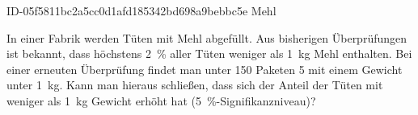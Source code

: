 \begin{exercise}
      {ID-05f5811bc2a5cc0d1afd185342bd698a9bebbc5e}
      {Mehl}
  \ifproblem\problem\par
    In einer Fabrik werden Tüten mit Mehl abgefüllt.
    Aus bisherigen Überprüfungen ist bekannt, dass
    höchstens \SI{2}{\percent} aller Tüten weniger
    als \SI{1}{\kilo\gram} Mehl enthalten.
    Bei einer erneuten Überprüfung findet man unter
    \num{150} Paketen \num{5} mit einem Gewicht
    unter \SI{1}{\kilo\gram}.
    Kann man hieraus schließen, dass sich der Anteil
    der Tüten mit weniger als \SI{1}{\kilo\gram}
    Gewicht erhöht hat
    (\SI{5}{\percent}-Signifikanzniveau)?
  \fi
\end{exercise}
